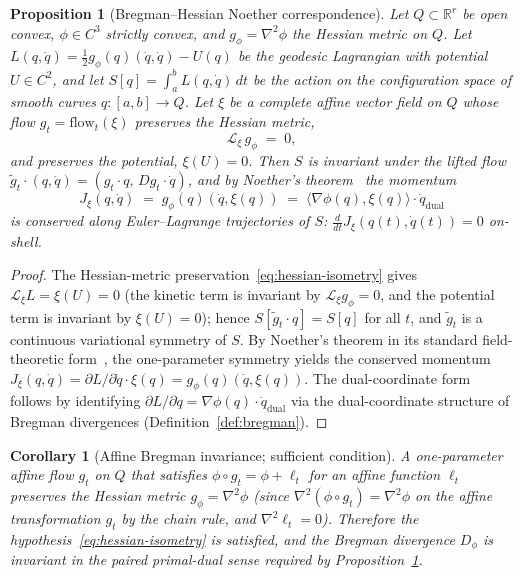 \documentclass[11pt,a4paper]{article}
\theoremstyle{plain}
\newtheorem{proposition}[theorem]{Proposition}
\newtheorem{corollary}[theorem]{Corollary}
\theoremstyle{definition}
\theoremstyle{remark}
\newcommand{\RR}{\mathbb{R}}
\begin{document}
\begin{proposition}[Bregman--Hessian Noether correspondence]
\label{prop:noether}
Let $Q \subset \RR^r$ be open convex, $\phi \in C^3$ strictly convex,
and $g_\phi = \nabla^2 \phi$ the Hessian metric on $Q$. Let
$L(q, \dot q) = \tfrac{1}{2} g_\phi(q)(\dot q, \dot q) - U(q)$ be the
geodesic Lagrangian with potential $U \in C^2$, and let
$S[q] = \int_a^b L(q, \dot q)\,dt$ be the action on the configuration
space of smooth curves $q : [a, b] \to Q$. Let $\xi$ be a complete
affine vector field on $Q$ whose flow $g_t = \mathrm{flow}_t(\xi)$
preserves the Hessian metric,
\begin{equation}\label{eq:hessian-isometry}
  \mathcal L_\xi\, g_\phi \;=\; 0,
\end{equation}
and preserves the potential, $\xi(U) = 0$. Then $S$ is invariant under
the lifted flow $\tilde g_t \cdot (q, \dot q) = (g_t \cdot q,\,
Dg_t \cdot \dot q)$, and by Noether's theorem~\cite{noether1918,olver1993}
the momentum
\begin{equation}\label{eq:noether-current}
  J_\xi(q, \dot q) \;=\; g_\phi(q)(\dot q, \xi(q)) \;=\; \langle \nabla \phi(q), \xi(q) \rangle \cdot \dot q_{\mathrm{dual}}
\end{equation}
is conserved along Euler--Lagrange trajectories of $S$: $\frac{d}{dt}
J_\xi(q(t), \dot q(t)) = 0$ on-shell.
\end{proposition}

\begin{proof}
The Hessian-metric preservation~\eqref{eq:hessian-isometry} gives
$\mathcal L_\xi L = \xi(U) = 0$ (the kinetic term is invariant by
$\mathcal L_\xi g_\phi = 0$, and the potential term is invariant by
$\xi(U) = 0$); hence $S[\tilde g_t \cdot q] = S[q]$ for all $t$, and
$\tilde g_t$ is a continuous variational symmetry of $S$. By
Noether's theorem in its standard field-theoretic form~\cite{olver1993},
the one-parameter symmetry yields the conserved momentum
$J_\xi(q, \dot q) = \partial L / \partial \dot q \cdot \xi(q) =
g_\phi(q)(\dot q, \xi(q))$. The dual-coordinate form follows by
identifying $\partial L / \partial \dot q = \nabla \phi(q) \cdot \dot
q_{\mathrm{dual}}$ via the dual-coordinate structure of Bregman
divergences (Definition~\ref{def:bregman}).
\end{proof}

\begin{corollary}[Affine Bregman invariance; sufficient condition]
\label{cor:affine-bregman}
A one-parameter affine flow $g_t$ on $Q$ that satisfies
$\phi \circ g_t = \phi + \ell_t$ for an affine function $\ell_t$
preserves the Hessian metric $g_\phi = \nabla^2 \phi$ (since
$\nabla^2(\phi \circ g_t) = \nabla^2 \phi$ on the affine transformation
$g_t$ by the chain rule, and $\nabla^2 \ell_t = 0$). Therefore the
hypothesis~\eqref{eq:hessian-isometry} is satisfied, and the Bregman
divergence $D_\phi$ is invariant in the paired primal-dual sense
required by Proposition~\ref{prop:noether}.
\end{corollary}
\end{document}
